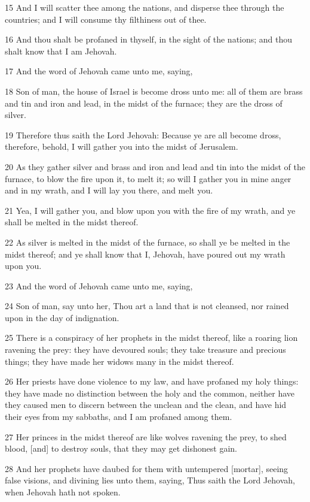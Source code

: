 \par 15 And I will scatter thee among the nations, and disperse thee through the countries; and I will consume thy filthiness out of thee.
\par 16 And thou shalt be profaned in thyself, in the sight of the nations; and thou shalt know that I am Jehovah.
\par 17 And the word of Jehovah came unto me, saying,
\par 18 Son of man, the house of Israel is become dross unto me: all of them are brass and tin and iron and lead, in the midst of the furnace; they are the dross of silver.
\par 19 Therefore thus saith the Lord Jehovah: Because ye are all become dross, therefore, behold, I will gather you into the midst of Jerusalem.
\par 20 As they gather silver and brass and iron and lead and tin into the midst of the furnace, to blow the fire upon it, to melt it; so will I gather you in mine anger and in my wrath, and I will lay you there, and melt you.
\par 21 Yea, I will gather you, and blow upon you with the fire of my wrath, and ye shall be melted in the midst thereof.
\par 22 As silver is melted in the midst of the furnace, so shall ye be melted in the midst thereof; and ye shall know that I, Jehovah, have poured out my wrath upon you.
\par 23 And the word of Jehovah came unto me, saying,
\par 24 Son of man, say unto her, Thou art a land that is not cleansed, nor rained upon in the day of indignation.
\par 25 There is a conspiracy of her prophets in the midst thereof, like a roaring lion ravening the prey: they have devoured souls; they take treasure and precious things; they have made her widows many in the midst thereof.
\par 26 Her priests have done violence to my law, and have profaned my holy things: they have made no distinction between the holy and the common, neither have they caused men to discern between the unclean and the clean, and have hid their eyes from my sabbaths, and I am profaned among them.
\par 27 Her princes in the midst thereof are like wolves ravening the prey, to shed blood, [and] to destroy souls, that they may get dishonest gain.
\par 28 And her prophets have daubed for them with untempered [mortar], seeing false visions, and divining lies unto them, saying, Thus saith the Lord Jehovah, when Jehovah hath not spoken.
